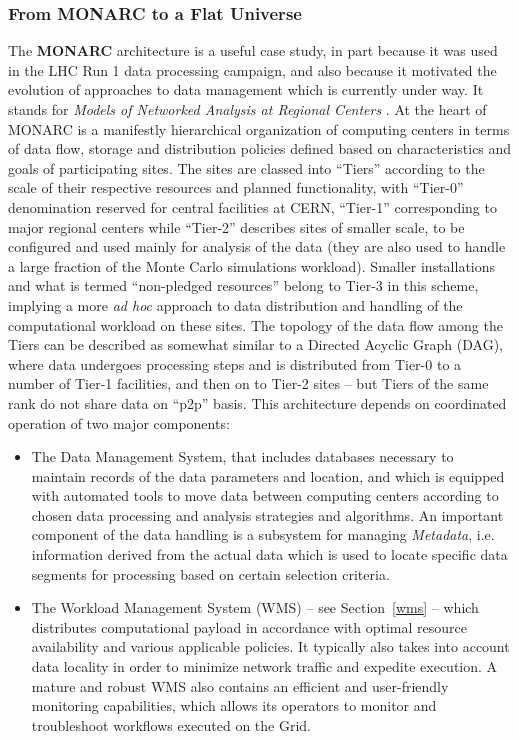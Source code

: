 \subsubsection{From MONARC to a Flat Universe}
The \textbf{MONARC} architecture is a useful case study, in part because it was used in the LHC Run 1 data processing campaign,
and also because it motivated the evolution of approaches to data management which is currently under way.
It stands for \textit{Models of Networked Analysis at Regional Centers} \cite{monarc}.
At the heart of  MONARC  is a manifestly hierarchical organization of computing centers in terms of
data flow, storage and distribution policies defined based on characteristics and goals of participating sites. The sites
are classed into ``Tiers'' according to the scale of their respective resources and planned functionality, with ``Tier-0'' denomination
reserved for central facilities at CERN, ``Tier-1'' corresponding to major regional centers while ``Tier-2'' describes
sites of smaller scale, to be configured and used mainly for analysis of the data (they are also used
to handle a large fraction of the Monte Carlo simulations workload). Smaller installations and what is termed ``non-pledged resources'' 
belong to Tier-3 in this scheme, implying a more \textit{ad hoc} approach to data distribution and handling of the computational
workload on these sites. The topology of the data flow among the
Tiers can be described as somewhat similar to a Directed Acyclic Graph (DAG), where data undergoes processing steps 
and is distributed from Tier-0 to a number of Tier-1 facilities, and then on to Tier-2 sites -- but Tiers of the same rank
do not share data on ``p2p'' basis.
This architecture depends on coordinated operation of two major components:
\begin{itemize}
	\item The Data Management System, that includes databases necessary to maintain records of the data parameters and location,
	and which is equipped with automated tools to move data between 
	computing centers according to chosen data processing and analysis strategies and algorithms. 
	An important component of the data handling is a subsystem for managing \textit{Metadata}, i.e. information
	derived from the actual data which is used to locate specific data segments for processing based on 
	certain selection criteria.
	
	\item The Workload Management System (WMS) -- see Section~\ref{wms} -- which distributes computational payload in accordance  
	with optimal resource availability and various applicable policies. It typically also takes
	into account data locality in order to minimize network traffic and expedite execution. A mature 
	and robust WMS also contains an efficient and user-friendly monitoring capabilities, which allows 
	its operators to monitor and troubleshoot workflows executed on the Grid.
	
\end{itemize}

